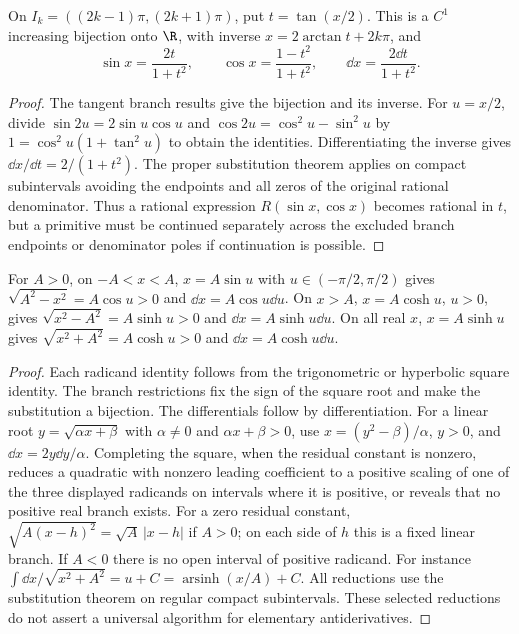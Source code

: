 \begin{proposition}
On $I_k=((2k-1)\pi,(2k+1)\pi)$, put $t=\tan(x/2)$.
This is a $C^1$ increasing bijection onto $\R$, with inverse
$x=2\arctan t+2k\pi$, and
\[\sin x=\frac{2t}{1+t^2},\qquad
\cos x=\frac{1-t^2}{1+t^2},\qquad
\dd x=\frac{2\dd t}{1+t^2}.
\]
\end{proposition}
\begin{proof}
The tangent branch results give the bijection and its inverse.
For $u=x/2$, divide $\sin2u=2\sin u\cos u$ and
$\cos2u=\cos^2u-\sin^2u$ by
$1=\cos^2u(1+\tan^2u)$ to obtain the identities.
Differentiating the inverse gives $\dd x/\dd t=2/(1+t^2)$.
The proper substitution theorem applies on compact subintervals avoiding
the endpoints and all zeros of the original rational denominator.
Thus a rational expression $R(\sin x,\cos x)$ becomes rational in $t$,
but a primitive must be continued separately across the excluded branch
endpoints or denominator poles if continuation is possible.
\end{proof}

\begin{example}
For $A>0$, on $-A<x<A$, $x=A\sin u$ with
$u\in(-\pi/2,\pi/2)$ gives
$\sqrt{A^2-x^2}=A\cos u>0$ and $\dd x=A\cos u\dd u$.
On $x>A$, $x=A\cosh u$, $u>0$, gives
$\sqrt{x^2-A^2}=A\sinh u>0$ and $\dd x=A\sinh u\dd u$.
On all real $x$, $x=A\sinh u$ gives
$\sqrt{x^2+A^2}=A\cosh u>0$ and $\dd x=A\cosh u\dd u$.
\end{example}
\begin{proof}
Each radicand identity follows from the trigonometric or hyperbolic
square identity. The branch restrictions fix the sign of the square root
and make the substitution a bijection. The differentials follow by
differentiation. For a linear root $y=\sqrt{\alpha x+\beta}$ with
$\alpha\ne0$ and $\alpha x+\beta>0$, use
$x=(y^2-\beta)/\alpha$, $y>0$, and $\dd x=2y\dd y/\alpha$.
Completing the square, when the residual constant is nonzero, reduces
a quadratic with nonzero leading coefficient to a positive scaling of
one of the three displayed radicands on intervals where it is positive,
or reveals that no positive real branch exists. For a zero residual
constant, $\sqrt{A(x-h)^2}=\sqrt A\,|x-h|$ if $A>0$; on each side
of $h$ this is a fixed linear branch. If $A<0$ there is no open interval
of positive radicand. For instance
$\int\dd x/\sqrt{x^2+A^2}=u+C=\operatorname{arsinh}(x/A)+C$.
All reductions use the substitution theorem on regular compact
subintervals. These selected reductions do not assert a universal
algorithm for elementary antiderivatives.
\end{proof}

